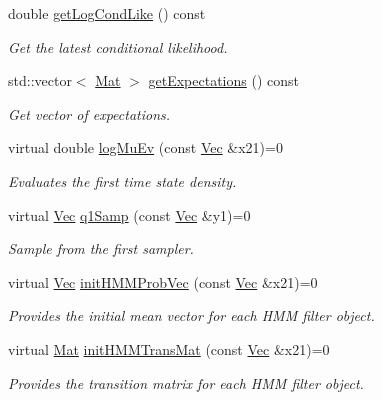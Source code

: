 \begin{DoxyCompactItemize}
double \hyperlink{classHmm__Rbpf_a6938942431c84e73f4918eaf87446844}{get\+Log\+Cond\+Like} () const 
\begin{DoxyCompactList}\small\item\em Get the latest conditional likelihood. \end{DoxyCompactList}\item 
std\+::vector$<$ \hyperlink{apf__filter_8h_ae601f56a556993079f730483c574356f}{Mat} $>$ \hyperlink{classHmm__Rbpf_a56340163d1ed12c1454aea347ab34f6e}{get\+Expectations} () const 
\begin{DoxyCompactList}\small\item\em Get vector of expectations. \end{DoxyCompactList}\item 
virtual double \hyperlink{classHmm__Rbpf_a0490747141865bdca060e4a49ca5430e}{log\+Mu\+Ev} (const \hyperlink{apf__filter_8h_a4c7df05c6f5e8a0d15ae14bcdbc07152}{Vec} \&x21)=0
\begin{DoxyCompactList}\small\item\em Evaluates the first time state density. \end{DoxyCompactList}\item 
virtual \hyperlink{apf__filter_8h_a4c7df05c6f5e8a0d15ae14bcdbc07152}{Vec} \hyperlink{classHmm__Rbpf_a1517fdbdf37a4dab6e6c0bca229fd4a0}{q1\+Samp} (const \hyperlink{apf__filter_8h_a4c7df05c6f5e8a0d15ae14bcdbc07152}{Vec} \&y1)=0
\begin{DoxyCompactList}\small\item\em Sample from the first sampler. \end{DoxyCompactList}\item 
virtual \hyperlink{apf__filter_8h_a4c7df05c6f5e8a0d15ae14bcdbc07152}{Vec} \hyperlink{classHmm__Rbpf_a33ab8bbb1a85fd06fa2d507fa5d48904}{init\+H\+M\+M\+Prob\+Vec} (const \hyperlink{apf__filter_8h_a4c7df05c6f5e8a0d15ae14bcdbc07152}{Vec} \&x21)=0
\begin{DoxyCompactList}\small\item\em Provides the initial mean vector for each H\+MM filter object. \end{DoxyCompactList}\item 
virtual \hyperlink{apf__filter_8h_ae601f56a556993079f730483c574356f}{Mat} \hyperlink{classHmm__Rbpf_a752c2997aee03219fe3eb4fbe63ed3af}{init\+H\+M\+M\+Trans\+Mat} (const \hyperlink{apf__filter_8h_a4c7df05c6f5e8a0d15ae14bcdbc07152}{Vec} \&x21)=0
\begin{DoxyCompactList}\small\item\em Provides the transition matrix for each H\+MM filter object. \end{DoxyCompactList}\item 

\end{DoxyCompactItemize}
